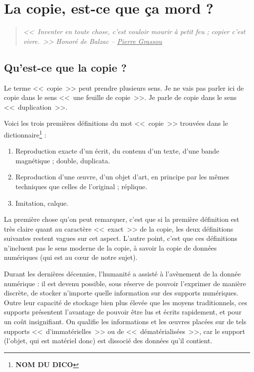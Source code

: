\chapter{La copie, est-ce que ça mord ?}

\begin{quote}
\textit{{\Large <<~Inventer en toute chose, c'est vouloir mourir à petit feu ; copier c'est vivre.~>>} \hspace{25pt}Honoré de Balzac -- \underline{Pierre Grassou}}
\end{quote}

\section{Qu'est-ce que la copie ?}

Le terme <<~copie~>> peut prendre plusieurs sens. Je ne vais pas parler ici de copie dans le sens <<~une feuille de copie~>>. Je parle de copie dans le sens <<~duplication~>>.

Voici les trois premières définitions du mot <<~copie~>> trouvées dans le dictionnaire\footnote{\textbf{NOM DU DICO}} :
\begin{enumerate}
\item Reproduction exacte d'un écrit, du contenu d'un texte, d'une bande magnétique ; double, duplicata.
\item Reproduction d'une œuvre, d'un objet d'art, en principe par les mêmes techniques que celles de l'original ; réplique.
\item Imitation, calque.
\end{enumerate}\bigskip

La première chose qu'on peut remarquer, c'est que si la première définition est très claire quant au caractère <<~exact~>> de la copie, les deux définitions suivantes restent vagues sur cet aspect.
L'autre point, c'est que ces définitions n'incluent pas le sens moderne de la copie, à savoir la copie de données numériques (qui est au cœur de notre sujet).

Durant les dernières décennies, l'humanité a assisté à l'avènement de la donnée numérique : il est devenu possible, sous réserve de pouvoir l'exprimer de manière discrète, de stocker n'importe quelle information sur des supports numériques.
Outre leur capacité de stockage bien plus élevée que les moyens traditionnels, ces supports présentent l'avantage de pouvoir être lus et écrits rapidement, et pour un coût insignifiant.
On qualifie les informations et les œuvres placées sur de tels supports <<~d'immatérielles~>> ou de <<~dématérialisées~>>, car le support (l'objet, qui est matériel donc) est dissocié des données qu'il contient.

